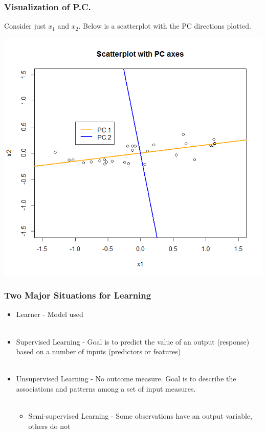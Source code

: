 \documentclass[hide notes,red,handout]{beamer}
\begin{document}
\begin{frame}[t]
\frametitle{Visualization of P.C.}
Consider just $x_1$ and $x_2$.  Below is a scatterplot with the PC directions plotted.
\begin{center}
\includegraphics[scale=0.4]{pcvisualization}
\end{center}
\end{frame}



\begin{frame}[t]
\frametitle{Two Major Situations for Learning}
\begin{itemize}
\item Learner - Model used\\~\\
\item Supervised Learning - Goal is to predict the value of an output (response) based on a number of inputs (predictors or features)\\~\\
\item Unsupervised Learning - No outcome measure.  Goal is to describe the associations and patterns among a set of input measures.\\~\\
\begin{itemize}
\item Semi-supervised Learning - Some observations have an output variable, others do not
\end{itemize}
\end{itemize}
\end{frame}
\end{document}
